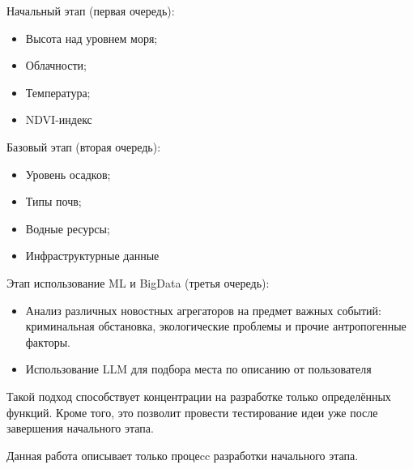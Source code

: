 Начальный этап (первая очередь):
\begin{itemize}
	\item Высота над уровнем моря;
	\item Облачности;
	\item Температура;
	\item NDVI-индекс
\end{itemize}

Базовый этап (вторая очередь):
\begin{itemize}
	\item Уровень осадков;
	\item Типы почв;
	\item Водные ресурсы;
	\item Инфраструктурные данные
\end{itemize}

Этап использование ML и BigData (третья очередь):
\begin{itemize}
	\item Анализ различных новостных агрегаторов на предмет важных событий: криминальная обстановка, экологические проблемы и прочие антропогенные факторы.
	\item Использование LLM для подбора места по описанию от пользователя 
\end{itemize}

Такой подход способствует концентрации на разработке только определённых функций.
Кроме того, это позволит провести тестирование идеи уже после завершения начального этапа.

Данная работа описывает только процеcc разработки начального этапа.